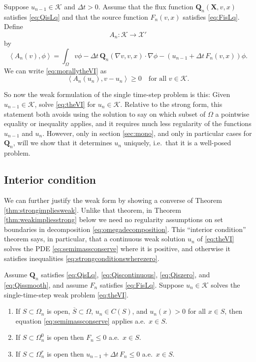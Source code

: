 \documentclass[final,leqno,onefignum,onetabnum]{siamltex1213bueler}
\newcommand\bQ{\mathbf{Q}}
\newcommand\bX{\mathbf{X}}
\renewcommand{\grad}{\nabla}
\newcommand{\ip}[2]{\ensuremath{\left<#1,#2\right>}}
\begin{document}
\medskip
\begin{definition}  Suppose $u_{n-1}\in\mathcal{K}$ and $\Delta t>0$.  Assume that the flux function $\bQ_n(\bX,v,x)$ satisfies \eqref{eq:QisLq} and that the source function $F_n(v,x)$ satisfies \eqref{eq:FisLq}.  Define
    $$A_n:\mathcal{K} \to \mathcal{X}'$$
by
\begin{equation}
  \ip{A_n(v)}{\phi} = \int_\Omega v \phi - \Delta t\, \bQ_n(\grad v,v,x) \cdot \grad\phi - \left(u_{n-1} + \Delta t\, F_n(v,x) \right) \phi. \label{eq:defineAn}
\end{equation}
We can write \eqref{eq:morallytheVI} as
\begin{equation}
  \ip{A_n(u_n)}{v-u_n} \ge 0 \quad \text{for all $v \in \mathcal{K}$.}\label{eq:theVI}
\end{equation}
\end{definition}

So now the weak formulation of the single time-step problem is this:  Given $u_{n-1}\in\mathcal{K}$, solve \eqref{eq:theVI} for $u_n\in\mathcal{K}$.  Relative to the strong form, this statement both avoids using the solution to say on which subset of $\Omega$ a pointwise equality or inequality applies, and it requires much less regularity of the functions $u_{n-1}$ and $u_n$.  However, only in section \ref{sec:mono}, and only in particular cases for $\bQ_n$, will we show that it determines $u_n$ uniquely, i.e.~that it is a well-posed problem.

\subsection{Interior condition}  \label{subsec:interior}  We can further justify the weak form by showing a converse of Theorem \ref{thm:strongimpliesweak}.  Unlike that theorem, in Theorem \ref{thm:weakimpliesstrong} below we need no regularity assumptions on set boundaries in decomposition \eqref{eq:omegadecomposition}.  This ``interior condition'' theorem says, in particular, that a continuous weak solution $u_n$ of \eqref{eq:theVI} solves the PDE \eqref{eq:semimassconserve} where it is positive, and otherwise it satisfies inequalities \eqref{eq:strongconditionswherezero}.

\medskip
\begin{theorem} \label{thm:weakimpliesstrong}  Assume $\bQ_n$ satisfies \eqref{eq:QisLq}, \eqref{eq:Qiscontinuous}, \eqref{eq:Qiszero}, and \eqref{eq:Qissmooth}, and assume $F_n$ satisfies \eqref{eq:FisLq}.  Suppose $u_n\in\mathcal{K}$ solves the single-time-step weak problem \eqref{eq:theVI}.
\renewcommand{\labelenumi}{\emph{(\roman{enumi})}}
\begin{enumerate}
\item If $S \subset \Omega_n$ is open, $\overline{S}\subset \Omega$, $u_n\in C(S)$, and $u_n(x)>0$ for all $x\in S$, then equation \eqref{eq:semimassconserve} applies a.e.~$x\in S$.
\item If $S \subset \Omega_n^0$ is open then $F_n \le 0$ a.e.~$x\in S$.
\item If $S \subset \Omega_n^r$ is open then $u_{n-1} + \Delta t\,F_n \le 0$ a.e.~$x\in S$.
\end{enumerate}
\end{theorem}
\end{document}
